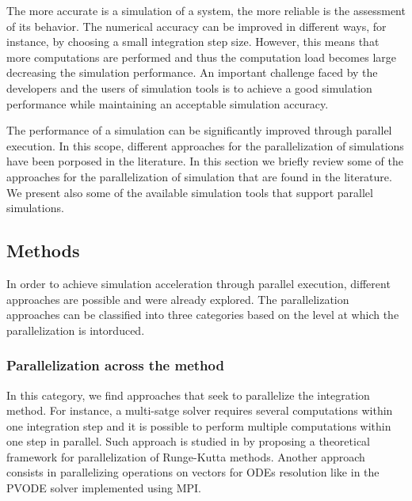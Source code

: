 The more accurate is a simulation of a system, the more reliable is the assessment of its behavior. The numerical accuracy can be improved in different ways, for instance, by choosing a small integration step size. However, this means that more computations are performed and thus the computation load becomes large decreasing the simulation performance. An important challenge faced by the developers and the users of simulation tools is to achieve a good simulation performance while maintaining an acceptable simulation accuracy. 

The performance of a simulation can be significantly improved through parallel execution. In this scope, different approaches for the parallelization of simulations have been porposed in the literature. In this section we briefly review some of the approaches for the parallelization of simulation that are found in the literature. We present also some of the available simulation tools that support parallel simulations.

\subsection{Methods}

In order to achieve simulation acceleration through parallel execution, different approaches are possible and were already explored. The parallelization approaches can be classified into three categories based on the level at which the parallelization is intorduced.

\subsubsection{Parallelization across the method}
In this category, we find approaches that seek to parallelize the integration method. For instance, a multi-satge solver requires several computations within one integration step and it is possible to perform multiple computations within one step in parallel. Such approach is studied in \cite{iserles:1990} by proposing a theoretical framework for parallelization of Runge-Kutta methods. Another approach consists in parallelizing operations on vectors for ODEs resolution like in the PVODE solver \cite{byrne:1999} implemented using MPI. 

